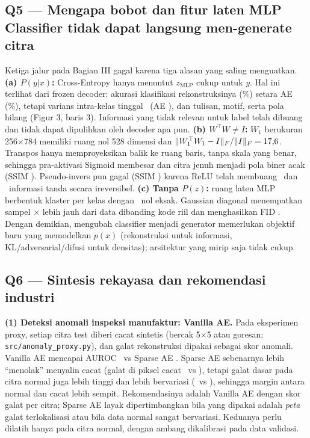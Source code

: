 \subsection*{Q5 --- Mengapa bobot dan fitur laten MLP Classifier tidak dapat langsung men-generate citra}
Ketiga jalur pada Bagian III gagal karena tiga alasan yang saling menguatkan. \textbf{(a) $P(y|x)$:} Cross-Entropy hanya menuntut
$z_{\text{MLP}}$ cukup untuk $y$. Hal ini terlihat dari frozen decoder: akurasi klasifikasi rekonstruksinya (\FdAcc\%) setara AE
(\AeAcc\%), tetapi varians intra-kelas tinggal \FdVar\ (AE \AeVar), dan tulisan, motif, serta pola hilang (Figur 3, baris 3).
Informasi yang tidak relevan untuk label telah dibuang dan tidak dapat dipulihkan oleh decoder apa pun.
\textbf{(b) $W^{\top}W\neq I$:} $W_1$ berukuran 256$\times$784 memiliki ruang nol 528 dimensi dan $\lVert W_1^{\top}W_1-I\rVert_F/\lVert I\rVert_F=17{,}6$.
Transpos hanya memproyeksikan balik ke ruang baris, tanpa skala yang benar, sehingga pra-aktivasi Sigmoid membesar dan citra jenuh
menjadi pola biner acak (SSIM \TthreeSSIM). Pseudo-invers pun gagal (SSIM \TpinvSSIM) karena ReLU telah membuang \ReluOne\ dan \ReluTwo\
informasi tanda secara ireversibel. \textbf{(c) Tanpa $P(z)$:} ruang laten MLP berbentuk klaster per kelas dengan \ZeroFrac\ nol
eksak. Gaussian diagonal menempatkan sampel \NNratio$\times$ lebih jauh dari data dibanding kode riil dan menghasilkan FID \FIDmlp.
Dengan demikian, mengubah classifier menjadi generator memerlukan objektif baru yang memodelkan $p(x)$ (rekonstruksi untuk
informasi, KL/adversarial/difusi untuk densitas); arsitektur yang mirip saja tidak cukup.

\subsection*{Q6 --- Sintesis rekayasa dan rekomendasi industri}
\textbf{(1) Deteksi anomali inspeksi manufaktur: Vanilla AE.} Pada eksperimen proxy, setiap citra test diberi cacat sintetis
(bercak 5$\times$5 atau goresan; \texttt{src/anomaly\_proxy.py}), dan galat rekonstruksi dipakai sebagai skor anomali.
Vanilla AE mencapai AUROC \AUCAE\ vs Sparse AE \AUCSAE. Sparse AE sebenarnya lebih ``menolak'' menyalin cacat (galat di piksel
cacat \FIXSAE\ vs \FIXAE), tetapi galat dasar pada citra normal juga lebih tinggi dan lebih bervariasi (\ERRNSAE\ vs \ERRNAE),
sehingga margin antara normal dan cacat lebih sempit. Rekomendasinya adalah Vanilla AE dengan skor galat per citra; Sparse AE layak
dipertimbangkan bila yang dipakai adalah \emph{peta} galat terlokalisasi atau bila data normal sangat bervariasi. Keduanya perlu
dilatih hanya pada citra normal, dengan ambang dikalibrasi pada data validasi.

